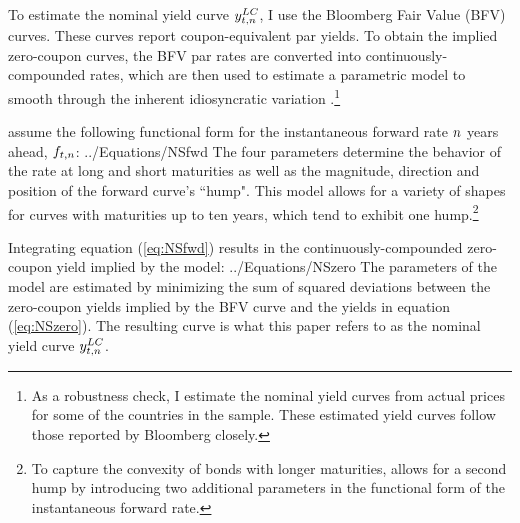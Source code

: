 {To estimate the nominal yield curve $y_{t,n} ^{LC}$, I use the Bloomberg Fair Value (BFV) curves.
These curves report coupon-equivalent par yields. 
To obtain the implied zero-coupon curves, the BFV par rates are converted into continuously-compounded rates, which are then used to estimate a parametric model to smooth through the inherent idiosyncratic variation \citep*[see][]{GSW:2007}.\footnote{As a robustness check, I estimate the nominal yield curves from actual prices for some of the countries in the sample. These estimated yield curves follow those reported by Bloomberg closely.}

\cite{NelsonSiegel:1987} assume the following  functional form for the instantaneous forward rate $n$ years ahead, $f_{t,n}$:
	 {../Equations/NSfwd}
The four parameters determine the behavior of the rate at long and short maturities as well as the magnitude, direction and position of the forward curve's ``hump".
This model allows for a variety of shapes for curves with maturities up to ten years, which tend to exhibit one hump.\footnote{ To capture the convexity of bonds with longer maturities, \cite{Svensson:1994} allows for a second hump by introducing two additional parameters in the functional form of the instantaneous forward rate.}

Integrating equation (\ref{eq:NSfwd}) results in the continuously-compounded zero-coupon yield implied by the model:
	 {../Equations/NSzero}
The parameters of the model are estimated by minimizing the sum of squared deviations between the zero-coupon yields implied by the BFV curve and the yields in equation (\ref{eq:NSzero}). The resulting curve is what this paper refers to as the nominal yield curve $y_{t,n} ^{LC}$.

}
